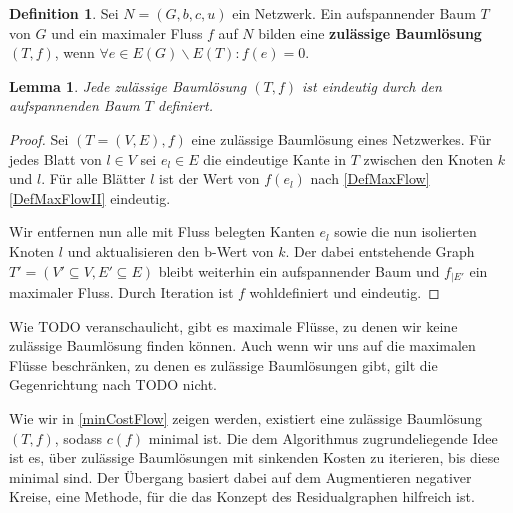 \documentclass[a4paper,twoside,ngerman]{report}
\theoremstyle{plain}
\newtheorem{lem}[thm]{Lemma}
\theoremstyle{definition}
\newtheorem{defn}[thm]{Definition}
\begin{document}
\begin{defn}Sei $N=(G,b,c,u)$ ein Netzwerk. Ein aufspannender Baum $T$ von $G$ und ein maximaler Fluss $f$ auf $N$ bilden eine \textbf{zulässige Baumlösung} $(T,f)$, wenn $\forall e\in E(G)\backslash E(T): f(e) = 0$.\end{defn}

\begin{lem}Jede zulässige Baumlösung $(T,f)$ ist eindeutig durch den aufspannenden Baum $T$ definiert.\end{lem}
\begin{proof}Sei $(T=(V,E),f)$ eine zulässige Baumlösung eines Netzwerkes. Für jedes Blatt von $l\in V$ sei $e_l\in E$ die eindeutige Kante in $T$ zwischen den Knoten $k$ und $l$. Für alle Blätter $l$ ist der Wert von $f(e_l)$ nach \cref{DefMaxFlow} \cref{DefMaxFlowII} eindeutig.
	
Wir entfernen nun alle mit Fluss belegten Kanten $e_l$ sowie die nun isolierten Knoten $l$ und aktualisieren den b-Wert von $k$. Der dabei entstehende Graph $T'=(V'\subseteq V,E'\subseteq E)$ bleibt weiterhin ein aufspannender Baum und $f_{|E'}$ ein maximaler Fluss. Durch Iteration ist $f$ wohldefiniert und eindeutig.\end{proof}

Wie TODO veranschaulicht, gibt es maximale Flüsse, zu denen wir keine zulässige Baumlösung finden können. Auch wenn wir uns auf die maximalen Flüsse beschränken, zu denen es zulässige Baumlösungen gibt, gilt die Gegenrichtung nach TODO nicht.

\begin{figure}[!h]\centering
{}
\end{figure}

Wie wir in \cref{minCostFlow} zeigen werden, existiert eine zulässige Baumlösung $(T,f)$, sodass $c(f)$ minimal ist. Die dem Algorithmus zugrundeliegende Idee ist es, über zulässige Baumlösungen mit sinkenden Kosten zu iterieren, bis diese minimal sind. Der Übergang basiert dabei auf dem Augmentieren negativer Kreise, eine Methode, für die das Konzept des Residualgraphen hilfreich ist.
\end{document}
